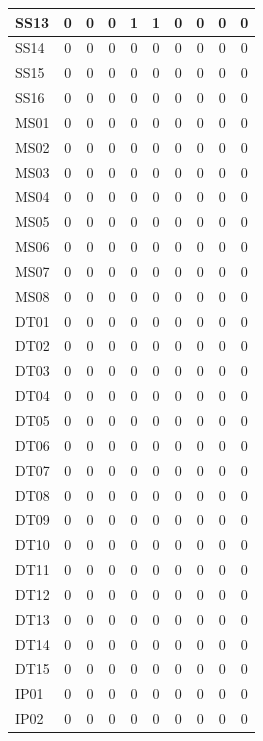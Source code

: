 \documentclass [10pt]{article}
\begin{document}
\begin{longtable}{ | p{} | c | c | c | c | c | c | c | c | c | }
	SS13 & 0 & 0 & 0 & 1 & 1 & 0 & 0 & 0 & 0 \\ \hline
	SS14 & 0 & 0 & 0 & 0 & 0 & 0 & 0 & 0 & 0 \\ \hline
	SS15 & 0 & 0 & 0 & 0 & 0 & 0 & 0 & 0 & 0 \\ \hline
	SS16 & 0 & 0 & 0 & 0 & 0 & 0 & 0 & 0 & 0 \\ \hline
	MS01 & 0 & 0 & 0 & 0 & 0 & 0 & 0 & 0 & 0 \\ \hline
	MS02 & 0 & 0 & 0 & 0 & 0 & 0 & 0 & 0 & 0 \\ \hline
	MS03 & 0 & 0 & 0 & 0 & 0 & 0 & 0 & 0 & 0 \\ \hline
	MS04 & 0 & 0 & 0 & 0 & 0 & 0 & 0 & 0 & 0 \\ \hline
	MS05 & 0 & 0 & 0 & 0 & 0 & 0 & 0 & 0 & 0 \\ \hline
	MS06 & 0 & 0 & 0 & 0 & 0 & 0 & 0 & 0 & 0 \\ \hline
	MS07 & 0 & 0 & 0 & 0 & 0 & 0 & 0 & 0 & 0 \\ \hline
	MS08 & 0 & 0 & 0 & 0 & 0 & 0 & 0 & 0 & 0 \\ \hline
	DT01 & 0 & 0 & 0 & 0 & 0 & 0 & 0 & 0 & 0 \\ \hline
	DT02 & 0 & 0 & 0 & 0 & 0 & 0 & 0 & 0 & 0 \\ \hline
	DT03 & 0 & 0 & 0 & 0 & 0 & 0 & 0 & 0 & 0 \\ \hline
	DT04 & 0 & 0 & 0 & 0 & 0 & 0 & 0 & 0 & 0 \\ \hline
	DT05 & 0 & 0 & 0 & 0 & 0 & 0 & 0 & 0 & 0 \\ \hline
	DT06 & 0 & 0 & 0 & 0 & 0 & 0 & 0 & 0 & 0 \\ \hline
	DT07 & 0 & 0 & 0 & 0 & 0 & 0 & 0 & 0 & 0 \\ \hline
	DT08 & 0 & 0 & 0 & 0 & 0 & 0 & 0 & 0 & 0 \\ \hline
	DT09 & 0 & 0 & 0 & 0 & 0 & 0 & 0 & 0 & 0 \\ \hline
	DT10 & 0 & 0 & 0 & 0 & 0 & 0 & 0 & 0 & 0 \\ \hline
	DT11 & 0 & 0 & 0 & 0 & 0 & 0 & 0 & 0 & 0 \\ \hline
	DT12 & 0 & 0 & 0 & 0 & 0 & 0 & 0 & 0 & 0 \\ \hline
	DT13 & 0 & 0 & 0 & 0 & 0 & 0 & 0 & 0 & 0 \\ \hline
	DT14 & 0 & 0 & 0 & 0 & 0 & 0 & 0 & 0 & 0 \\ \hline
	DT15 & 0 & 0 & 0 & 0 & 0 & 0 & 0 & 0 & 0 \\ \hline
	IP01 & 0 & 0 & 0 & 0 & 0 & 0 & 0 & 0 & 0 \\ \hline
	IP02 & 0 & 0 & 0 & 0 & 0 & 0 & 0 & 0 & 0 \\ \hline

\end{longtable}
\end{document}
